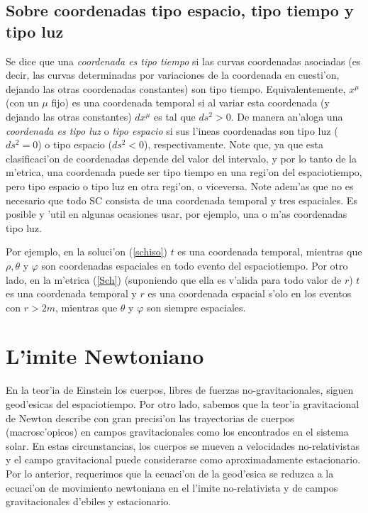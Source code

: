 \subsection{Sobre coordenadas tipo espacio, tipo tiempo y tipo luz}

Se dice que una \textit{coordenada es tipo tiempo} si las curvas coordenadas asociadas (es decir, las curvas determinadas por variaciones de la coordenada en cuesti'on, dejando las otras coordenadas constantes) son tipo tiempo. Equivalentemente, $x^\mu$ (con un $\mu$ fijo) es una coordenada temporal si al variar esta coordenada (y dejando las otras constantes) $dx^\mu$ es tal que $ds^2>0$. De manera an'aloga una \textit{coordenada es tipo luz} o \textit{tipo espacio} si sus l'ineas coordenadas son tipo luz ($ds^2=0$) o tipo espacio ($ds^2<0$), respectivamente. Note que, ya que esta clasificaci'on de coordenadas depende del valor del intervalo, y por lo tanto de la m'etrica, una coordenada puede ser tipo tiempo en una regi'on del espaciotiempo, pero tipo espacio o tipo luz en otra regi'on, o viceversa. Note adem'as que no es necesario que todo SC consista de una coordenada temporal y tres espaciales. Es posible y 'util en algunas ocasiones usar, por ejemplo, una o m'as coordenadas tipo luz.

Por ejemplo, en la soluci'on (\ref{schiso}) $t$ es una coordenada temporal, mientras que $\rho, \theta$ y $\varphi$ son coordenadas espaciales en todo evento del espaciotiempo. Por otro lado, en la m'etrica (\ref{Sch})  (suponiendo que ella es v'alida para todo valor de $r$) $t$ es una coordenada temporal y $r$ es una coordenada espacial s'olo en los eventos con $r>2m$, mientras que $\theta$ y $\varphi$ son siempre espaciales.


\section{L'imite Newtoniano}

En la teor'ia de Einstein los cuerpos, libres de fuerzas no-gravitacionales, siguen geod'esicas del espaciotiempo.
Por otro lado, sabemos que la teor'ia gravitacional de Newton describe con
gran precisi'on las trayectorias de cuerpos (macrosc'opicos) en campos
gravitacionales como los encontrados en el sistema solar. En estas
circunstancias, los cuerpos se mueven a velocidades no-relativistas y el campo gravitacional puede considerarse como aproximadamente estacionario. Por lo
anterior, requerimos que la ecuaci'on de la geod'esica se reduzca a la
ecuaci'on de movimiento newtoniana en el l'imite no-relativista y de campos
gravitacionales d'ebiles y estacionario.

